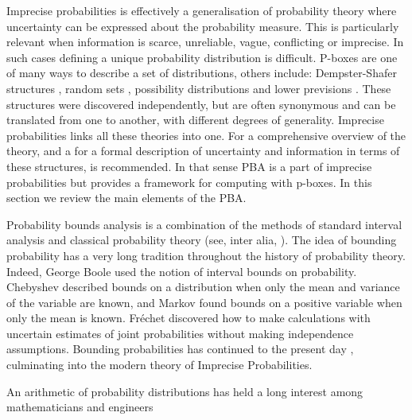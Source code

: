 \documentclass{juliacon}
\begin{document}
Imprecise probabilities is effectively a generalisation of probability theory where uncertainty can be expressed about the probability measure. This 
is particularly relevant when information is scarce, unreliable, vague, conflicting or imprecise. In such cases defining a unique probability distribution is difficult. P-boxes are one of many ways to describe a set of distributions, others include: Dempster-Shafer structures \cite{dempster2008upper,shafer1976mathematical}, random sets \cite{molchanov2005theory}, possibility distributions \cite{zadeh1978fuzzy,dubois1988possibility, hose2019possibilistic} and lower previsions \cite{troffaes2014lower}. These structures were discovered independently, but are often synonymous and can be translated from one to another, with different degrees of generality. Imprecise probabilities links all these theories into one. For a comprehensive overview of the theory, and a for a formal description of uncertainty and information in terms of these structures, \cite{klir2013uncertainty} is recommended. In that sense PBA is a part of imprecise probabilities but provides a framework for computing with p-boxes. In this section we review the main elements of the PBA.



\iffalse
Probability bounds analysis is a combination of the methods of standard interval analysis \cite{moore1996interval, jaulin2001interval} and classical probability theory (see, inter alia, \cite{feller1968probability, feller1971probability}).  The idea of bounding probability has a very long tradition throughout the history of probability theory.  Indeed, George Boole \cite{boole1854investigation, hailperin1986boole} used the notion of interval bounds on probability.  Chebyshev \cite{chebyshev1874valeurs} described bounds on a distribution when only the mean and variance of the variable are known, and Markov \cite{markoff1900question} found bounds on a positive variable when only the mean is known.  Fréchet \cite{frechet1935generalisation} discovered how to make calculations with uncertain estimates of joint probabilities without making independence assumptions.  Bounding probabilities has continued to the present day \cite{walley1991statistical, klir2013uncertainty, troffaes2014lower, augustin2014introduction}, culminating into the modern theory of Imprecise Probabilities.

An arithmetic of probability distributions has held a long interest among mathematicians and engineers
\end{document}
